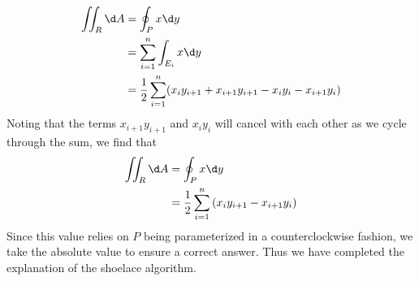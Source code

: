 \documentclass{ximera}
\begin{document}
\begin{algorithm}[Shoelace]
\begin{explanation}
    \begin{align*}
      \iint_R \d A &= \oint_P x\d y\\
      &= \sum_{i=1}^n \int_{E_i} x\d y\\
      &= \frac{1}{2}\sum_{i=1}^n (x_i y_{i+1}+ x_{i+1} y_{i+1} - x_iy_i - x_{i+1}y_i)
    \end{align*}
    Noting that the terms $x_{i+1} y_{i+1}$ and
    $x_iy_i$ will cancel with each other as we cycle through
    the sum, we find that
    \begin{align*}
      \iint_R \d A &= \oint_P x\d y\\
      &= \frac{1}{2} \sum_{i=1}^n \left(x_iy_{i+1} - x_{i+1}y_i\right)
    \end{align*}
    Since this value relies on $P$ being parameterized in a
    counterclockwise fashion, we take the absolute value to ensure a
    correct answer. Thus we have completed the explanation of the shoelace algorithm.
  \end{explanation}
\end{algorithm}
\end{document}
